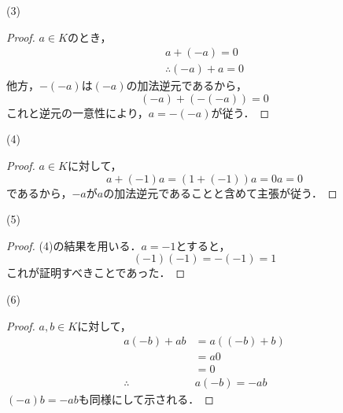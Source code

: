 \documentclass[dvipdfmx,uplatex,11pt]{jsarticle}
\theoremstyle{definition}
\begin{document}
    \begin{itembox}[c]{(3)}
        \begin{proof}
$a \in K$のとき，
\begin{gather*}
    a+(-a)=0 \\
    \therefore (-a)+a =0
\end{gather*}
他方，$-(-a)$は$(-a)$の加法逆元であるから，
\[
    (-a)+(-(-a))=0
\]
これと逆元の一意性により，$a=-(-a)$が従う．
\end{proof}
\end{itembox}
\begin{itembox}[c]{(4)}
    \begin{proof}
    $a \in K$に対して，
    \[
        a+(-1)a=(1+(-1))a =0a =0
    \]
    であるから，$-a$が$a$の加法逆元であることと含めて主張が従う．
    \end{proof}
\end{itembox}
\newpage 
\begin{itembox}[c]{(5)}
    \begin{proof}
    (4)の結果を用いる．$a=-1$とすると，
    \[
        (-1)(-1)=-(-1)=1
    \]
    これが証明すべきことであった．
    \end{proof}
\end{itembox}
\begin{itembox}[c]{(6)}
    \begin{proof}
    $a,b \in K$に対して，
    \begin{align*}
     a(-b)+ab & = a((-b)+b) \\
     & = a0 \\
    & =0 \\
\therefore \quad & a(-b)=-ab 
    \end{align*}
$(-a)b = -ab$も同様にして示される．
\end{proof}
\end{itembox}
%
\newpage
\end{document}
